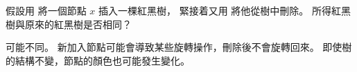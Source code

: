 \startEXERCISE
假設用  將一個節點 $x$ 插入一棵紅黑樹，
緊接着又用  將他從樹中刪除。
所得紅黑樹與原來的紅黑樹是否相同？
\stopEXERCISE

\startANSWER
可能不同。
新加入節點可能會導致某些旋轉操作，刪除後不會旋轉回來。
即使樹的結構不變，節點的顏色也可能發生變化。
\stopANSWER
